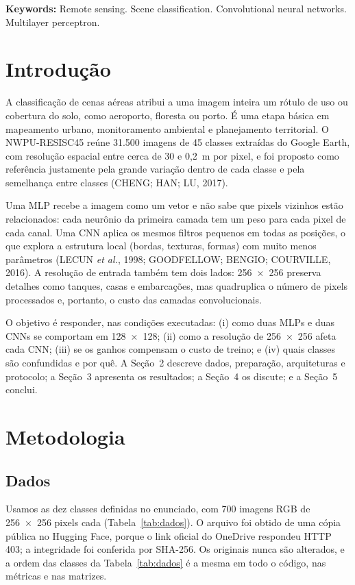 \documentclass[12pt,a4paper]{article}
\begin{document}
\noindent\textbf{Keywords:} Remote sensing. Scene classification. Convolutional neural networks. Multilayer perceptron.

\section{Introdução}

A classificação de cenas aéreas atribui a uma imagem inteira um rótulo de uso ou cobertura do solo, como aeroporto, floresta ou porto. É uma etapa básica em mapeamento urbano, monitoramento ambiental e planejamento territorial. O NWPU-RESISC45 reúne 31.500 imagens de 45 classes extraídas do Google Earth, com resolução espacial entre cerca de 30 e 0,2~m por pixel, e foi proposto como referência justamente pela grande variação dentro de cada classe e pela semelhança entre classes (CHENG; HAN; LU, 2017).

Uma MLP recebe a imagem como um vetor e não sabe que pixels vizinhos estão relacionados: cada neurônio da primeira camada tem um peso para cada pixel de cada canal. Uma CNN aplica os mesmos filtros pequenos em todas as posições, o que explora a estrutura local (bordas, texturas, formas) com muito menos parâmetros (LECUN \textit{et al.}, 1998; GOODFELLOW; BENGIO; COURVILLE, 2016). A resolução de entrada também tem dois lados: 256~×~256 preserva detalhes como tanques, casas e embarcações, mas quadruplica o número de pixels processados e, portanto, o custo das camadas convolucionais.

O objetivo é responder, nas condições executadas: (i) como duas MLPs e duas CNNs se comportam em 128~×~128; (ii) como a resolução de 256~×~256 afeta cada CNN; (iii) se os ganhos compensam o custo de treino; e (iv) quais classes são confundidas e por quê. A Seção~2 descreve dados, preparação, arquiteturas e protocolo; a Seção~3 apresenta os resultados; a Seção~4 os discute; e a Seção~5 conclui.

\section{Metodologia}

\subsection{Dados}

Usamos as dez classes definidas no enunciado, com 700 imagens RGB de 256~×~256 pixels cada (Tabela~\ref{tab:dados}). O arquivo foi obtido de uma cópia pública no Hugging Face, porque o link oficial do OneDrive respondeu HTTP 403; a integridade foi conferida por SHA-256. Os originais nunca são alterados, e a ordem das classes da Tabela~\ref{tab:dados} é a mesma em todo o código, nas métricas e nas matrizes.
\end{document}
